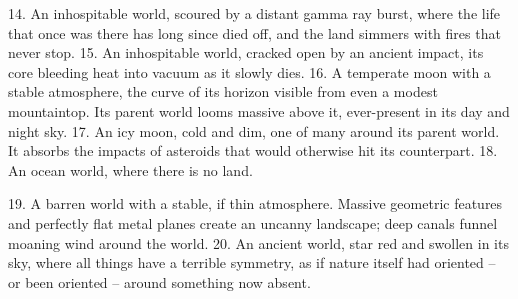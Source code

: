      14. An inhospitable world, scoured by a distant gamma ray burst, where the life that once was
         there has long since died off, and the land simmers with fires that never stop.
     15. An inhospitable world, cracked open by an ancient impact, its core bleeding heat into
         vacuum as it slowly dies.
     16. A temperate moon with a stable atmosphere, the curve of its horizon visible from even a
         modest mountaintop. Its parent world looms massive above it, ever-present in its day and
         night sky.
     17. An icy moon, cold and dim, one of many around its parent world. It absorbs the impacts of
         asteroids that would otherwise hit its counterpart.
     18. An ocean world, where there is no land.




    19. A barren world with a stable, if thin atmosphere. Massive geometric features and perfectly
        flat metal planes create an uncanny landscape; deep canals funnel moaning wind around
        the world.
    20. An ancient world, star red and swollen in its sky, where all things have a terrible symmetry,
        as if nature itself had oriented -- or been oriented -- around something now absent.

